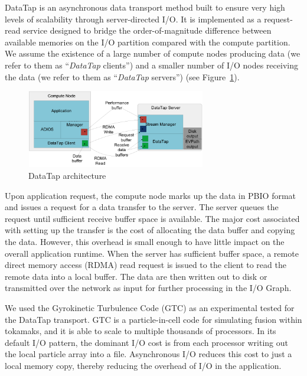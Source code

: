 DataTap is an asynchronous data transport method built to ensure very high levels 
of scalability through server-directed I/O. It is implemented as a request-read 
service designed to bridge the order-of-magnitude difference between available 
memories on the I/O partition compared with the compute partition. We assume the 
existence of a large number of compute nodes producing data (we refer to them as 
``\textit{DataTap }clients'') and a smaller number of I/O nodes receiving the data 
(we refer to them as ``\textit{DataTap }servers'') (see Figure~\ref{fig:datatap-arch}). 

\begin{figure}[htbp]
\begin{center}
\includegraphics[width=222pt, height=97pt]{figures/datatap-architecture.png}
\caption{DataTap architecture}
\label{fig:datatap-arch}
\end{center}
\end{figure}


Upon application request, the compute node marks up the data in PBIO format and 
issues a request for a data transfer to the server. The server queues the request 
until sufficient receive buffer space is available. The major cost associated with 
setting up the transfer is the cost of allocating the data buffer and copying the 
data. However, this overhead is small enough to have little impact on the overall 
application runtime. When the server has sufficient buffer space, a remote direct 
memory access (RDMA) read request is issued to the client to read the remote data 
into a local buffer. The data are then written out to disk or transmitted over 
the network as input for further processing in the I/O Graph. 

We used the Gyrokinetic Turbulence Code (GTC) as an experimental tested for the 
DataTap transport. GTC is a particle-in-cell code for simulating fusion within 
tokamaks, and it is able to scale to multiple thousands of processors. In its default 
I/O pattern, the dominant I/O cost is from each processor writing out the local 
particle array into a file. Asynchronous I/O reduces this cost to just a local 
memory copy, thereby reducing the overhead of I/O in the application.

